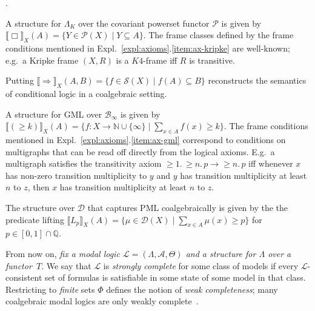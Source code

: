 \documentclass[proceedings]{stacs}
\theoremstyle{definition}
\theoremstyle{plain}
\newcommand{\Pow}{\mathcal{P}}
\newcommand{\modimpl}{\to}
\newcommand{\Lang}{\mathcal{L}}
\newcommand{\Nat}{{\mathbb{N}}}
\newcommand{\Baginfty}{\mathcal{B}_\infty}
\DeclareMathOperator{\mge}{\ge}
\newcommand{\Ax}{\mathcal{A}}
\newcommand{\Sel}{\mathcal{S}}
\newcommand{\Dist}{\mathcal{D}}
\newcommand{\To}{\Rightarrow}
\newcommand{\lsem}{\llbracket}
\newcommand{\rsem}{\rrbracket}
\newcounter{blubber}
\newenvironment{sparenumerate}
{\begin{list}
  {\arabic{blubber}.}
  {\usecounter{blubber}
   \setlength{\leftmargin}{0pt}
    \setlength{\parsep}{0pt}
    \setlength{\itemindent}{3ex}
    \setlength{\itemsep}{2pt}   
    \setlength{\listparindent}{3ex}
  }
}
{\end{list}}
\begin{document}
\begin{exas}\label{expl:structure}
\begin{sparenumerate}
\item A structure for $\Lambda_K$ over the covariant powerset functor
  $\Pow$ is given by $\lsem \Box \rsem_X (A) = \lbrace Y \in \Pow(X)
  \mid Y \subseteq A \rbrace$. The frame classes defined by the frame
  conditions mentioned in Expl.~\ref{expl:axioms}.\ref{item:ax-kripke}
  are well-known; e.g.\ a Kripke frame $(X,R)$ is a $K4$-frame iff $R$
  is transitive.
\item Putting $\lsem \To \rsem_X (A, B) = \lbrace f \in \Sel(X) \mid
  f(A) \subseteq B \rbrace$ reconstructs the semantics of conditional
  logic in a coalgebraic setting. 
\item\label{item:gml-struct} A structure for GML over
  $\Baginfty$ is given by $\lsem (\mge k) \rsem_X (A) = \lbrace f: X
  \to \Nat \cup \lbrace \infty \rbrace \mid \sum_{x \in A} f(x) \geq
	k \rbrace$. The frame conditions mentioned in
  Expl.~\ref{expl:axioms}.\ref{item:ax-gml} correspond to conditions
  on multigraphs that can be read off directly from the logical
  axioms. E.g.\ a multigraph satisfies the transitivity axiom $\mge
  1.\,\mge n.\,p\modimpl\mge n.\,p$ iff whenever $x$ has non-zero
  transition multiplicity to $y$ and $y$ has transition multiplicity
  at least $n$ to $z$, then $x$ has transition multiplicity at least
  $n$ to $z$.
\item The structure over $\Dist$ that captures PML coalgebraically is
  given by the the predicate lifting $\lsem L_p \rsem_X (A) = \lbrace
  \mu \in \Dist(X) \mid \sum_{x \in A} \mu(x) \geq p \rbrace$ for $p
  \in [0, 1 ] \cap \mathbb{Q}$.
\end{sparenumerate}
\end{exas}
\noindent From now on, \emph{fix a modal logic $\Lang=(\Lambda, \Ax,
  \Theta)$ and a structure for $\Lambda$ over a functor~$T$}. 
We say that $\Lang$ is \emph{strongly complete} for some class of
models if every $\Lang$-consistent set of formulas is satisfiable in
some state of some model in that class. Restricting to \emph{finite}
sets $\Phi$ defines the notion of \emph{weak completeness}; many
coalgebraic modal logics are only weakly complete~\cite{Schroder07}.
\end{document}
